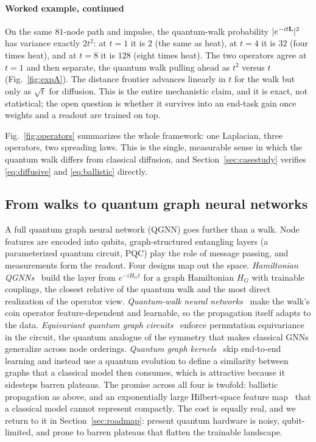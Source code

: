 \paragraph*{Worked example, continued} On the same $81$-node path and impulse, the
quantum-walk probability $|e^{-it\mathbf{L}}|^2$ has variance exactly $2t^2$: at $t=1$ it is
$2$ (the same as heat), at $t=4$ it is $32$ (four times heat), and at $t=8$ it is $128$
(eight times heat). The two operators agree at $t=1$ and then separate, the quantum
walk pulling ahead as $t^2$ versus $t$ (Fig.~\ref{fig:expA}). The distance frontier
advances linearly in $t$ for the walk but only as $\sqrt{t}$ for diffusion. This is the
entire mechanistic claim, and it is exact, not statistical; the open question is whether
it survives into an end-task gain once weights and a readout are trained on top.

Fig.~\ref{fig:operators} summarizes the whole framework: one Laplacian, three
operators, two spreading laws. This is the single, measurable sense in which the
quantum walk differs from classical diffusion, and Section~\ref{sec:casestudy}
verifies \eqref{eq:diffusive} and \eqref{eq:ballistic} directly.



\subsection{From walks to quantum graph neural networks}
A full quantum graph neural network (QGNN) goes further than a walk. Node features
are encoded into qubits, graph-structured entangling layers (a parameterized quantum
circuit, PQC) play the role of message passing, and measurements form the readout. Four
designs map out the space. \emph{Hamiltonian QGNNs}~\cite{verdon2019qgnn} build the layer
from $e^{-iH_G t}$ for a graph Hamiltonian $H_G$ with trainable couplings, the closest
relative of the quantum walk and the most direct realization of the operator view.
\emph{Quantum-walk neural networks}~\cite{dernbach2019qwnn} make the walk's coin
operator feature-dependent and learnable, so the propagation itself adapts to the data.
\emph{Equivariant quantum graph circuits}~\cite{mernyei2022equivariant} enforce
permutation equivariance in the circuit, the quantum analogue of the symmetry that makes
classical GNNs generalize across node orderings. \emph{Quantum graph
kernels}~\cite{henry2021quantumkernel} skip end-to-end learning and instead use a quantum
evolution to define a similarity between graphs that a classical model then consumes,
which is attractive because it sidesteps barren plateaus. The promise across all four is
twofold: ballistic propagation as above, and an exponentially large Hilbert-space feature
map~\cite{schuld2019featurespace,havlicek2019supervised} that a classical model cannot
represent compactly.
The cost is equally real, and we return to it in Section~\ref{sec:roadmap}: present
quantum hardware is noisy, qubit-limited, and prone to barren plateaus that flatten
the trainable landscape.

